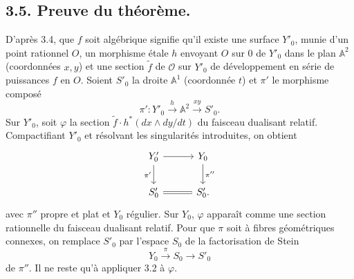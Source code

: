 \documentclass[11pt,leqno]{article}
\newcommand{\OO}{\mathcal O}
\newcommand{\Aaff}{\mathbb A}
\begin{document}
\subsection*{3.5. Preuve du théorème.}
D'après 3.4, que $f$ soit algébrique signifie qu'il existe une surface $Y'_0$, munie d'un point rationnel $O$, un morphisme étale $h$ envoyant $O$ sur 0 de $Y'_0$ dans le plan $\Aaff^2$ (coordonnées $x,y$) et une section $\widetilde f$ de $\OO$ sur $Y'_0$ de développement en série de puissances $f$ en $O$. Soient $S'_0$ la droite $\Aaff^1$ (coordonnée $t$) et $\pi'$ le morphisme composé
\[
        \pi':Y'_0\xrightarrow{h}\Aaff^2\xrightarrow{xy}S'_0.
\]
Sur $Y'_0$, soit $\varphi$ la section $\widetilde f\cdot h^*(dx\wedge dy/dt)$ du faisceau dualisant relatif. Compactifiant $Y'_0$ et résolvant les singularités introduites, on obtient
\[
\begin{tikzcd}[column sep=3em,row sep=2em]
Y'_0 \arrow[r] \arrow[d,"\pi'"'] & Y_0 \arrow[d,"\pi''"] \\
S'_0 \arrow[r,equal] & S'_0.
\end{tikzcd}
\]
avec $\pi''$ propre et plat et $Y_0$ régulier. Sur $Y_0$, $\varphi$ apparaît comme une section rationnelle du faisceau dualisant relatif. Pour que $\pi$ soit à fibres géométriques connexes, on remplace $S'_0$ par l'espace $S_0$ de la factorisation de Stein
\[
        Y_0\xrightarrow{\pi}S_0\longrightarrow S'_0
\]
de $\pi''$. Il ne reste qu'à appliquer 3.2 à $\varphi$.
\end{document}
